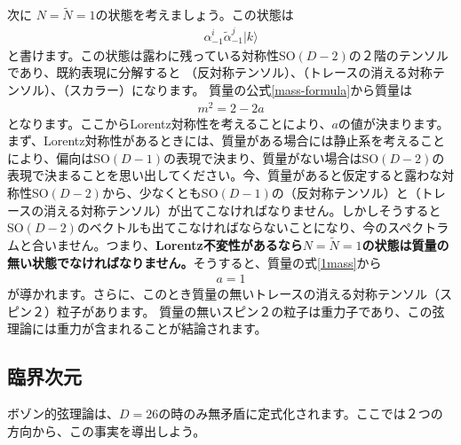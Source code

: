 \documentclass[report,paper=a4, fontsize=12pt, line_length=16cm, number_of_lines=33,dvipdfmx]{jlreq}
\numberwithin{equation}{chapter}
\numberwithin{equation}{section}
\newcommand{\kyou}[1]{{\sffamily \bfseries #1}}
\newcommand{\alphat}{\tilde{\alpha}}
\newcommand{\Nt}{\widetilde{N}}
\begin{document}
次に $N=\Nt=1$の状態を考えましょう。この状態は
\begin{align}
\alpha^i_{-1}\alphat^{j}_{-1}|k\rangle
\end{align}
と書けます。この状態は露わに残っている対称性SO$(D-2)$の２階のテンソルであり、既約表現に分解すると
（反対称テンソル）、（トレースの消える対称テンソル）、（スカラー）になります。
質量の公式\eqref{mass-formula}から質量は
\begin{align}
m^2=2-2a\label{1mass}
\end{align}
となります。ここからLorentz対称性を考えることにより、$a$の値が決まります。まず、Lorentz対称性があるときには、質量がある場合には静止系を考えることにより、偏向はSO$(D-1)$の表現で決まり、質量がない場合はSO$(D-2)$の表現で決まることを思い出してください。今、質量があると仮定すると露わな対称性SO$(D-2)$から、少なくともSO$(D-1)$の（反対称テンソル）と（トレースの消える対称テンソル）が出てこなければなりません。しかしそうするとSO$(D-2)$のベクトルも出てこなければならないことになり、今のスペクトラムと合いません。つまり、\kyou{Lorentz不変性があるなら$N=\Nt=1$の状態は質量の無い状態でなければなりません。}そうすると、質量の式\eqref{1mass}から
\begin{align}
a=1
\end{align}
が導かれます。さらに、このとき質量の無いトレースの消える対称テンソル（スピン２）粒子があります。
質量の無いスピン２の粒子は重力子であり、この弦理論には重力が含まれることが結論されます。

\subsection{臨界次元}
ボゾン的弦理論は、$D=26$の時のみ無矛盾に定式化されます。ここでは２つの方向から、この事実を導出しよう。
\end{document}
